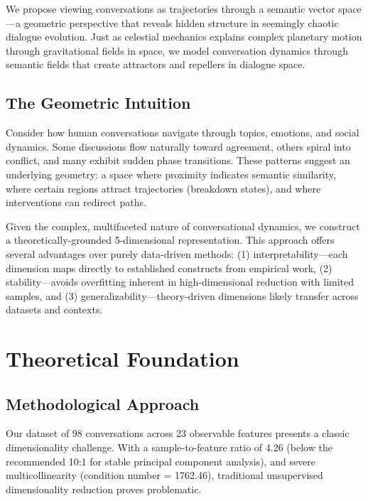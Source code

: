 \documentclass[11pt,letterpaper]{article}
\newcommand{\totalConversations}{98}
\newcommand{\featureCount}{23}
\newcommand{\sampleFeatureRatio}{4.26}
\newcommand{\conditionNumber}{1762.46}
\newcommand{\recommendedRatio}{10}
\begin{document}
We propose viewing conversations as trajectories through a semantic vector space—a geometric perspective that reveals hidden structure in seemingly chaotic dialogue evolution. Just as celestial mechanics explains complex planetary motion through gravitational fields in space, we model conversation dynamics through semantic fields that create attractors and repellers in dialogue space.

\subsection{The Geometric Intuition}

Consider how human conversations navigate through topics, emotions, and social dynamics. Some discussions flow naturally toward agreement, others spiral into conflict, and many exhibit sudden phase transitions. These patterns suggest an underlying geometry: a space where proximity indicates semantic similarity, where certain regions attract trajectories (breakdown states), and where interventions can redirect paths.

Given the complex, multifaceted nature of conversational dynamics, we construct a theoretically-grounded 5-dimensional representation. This approach offers several advantages over purely data-driven methods: (1) interpretability—each dimension maps directly to established constructs from empirical work, (2) stability—avoids overfitting inherent in high-dimensional reduction with limited samples, and (3) generalizability—theory-driven dimensions likely transfer across datasets and contexts.

\section{Theoretical Foundation}

\subsection{Methodological Approach}

Our dataset of \totalConversations{} conversations across \featureCount{} observable features presents a classic dimensionality challenge. With a sample-to-feature ratio of \sampleFeatureRatio{} (below the recommended \recommendedRatio{}:1 for stable principal component analysis), and severe multicollinearity (condition number = \conditionNumber{}), traditional unsupervised dimensionality reduction proves problematic.
\end{document}
